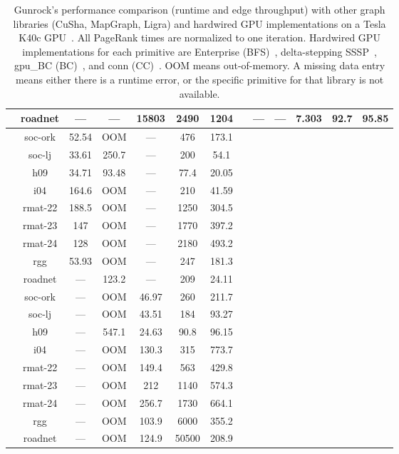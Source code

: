 \documentclass[format=acmsmall,review=false,screen=true]{acmart}
\begin{document}
\begin{table}[t]
{\begin{tabular}{*{13}{c}}
           & roadnet & ---   & ---      & 15803     & 2490  & 1204    && ---   & ---      & 7.303     & 92.7  & 95.85   \\
      \midrule\parbox[t]{2mm}{}
           & soc-ork & 52.54 & OOM      & ---       & 476   & 173.1   \\
           & soc-lj  & 33.61 & 250.7    & ---       & 200   & 54.1    \\
           & h09     & 34.71 & 93.48    & ---       & 77.4  & 20.05   \\
           & i04     & 164.6 & OOM      & ---       & 210   & 41.59   \\
           & rmat-22 & 188.5 & OOM      & ---       & 1250  & 304.5   \\
           & rmat-23 & 147   & OOM      & ---       & 1770  & 397.2   \\
           & rmat-24 & 128   & OOM      & ---       & 2180  & 493.2   \\
           & rgg     & 53.93 & OOM      & ---       & 247   & 181.3   \\
           & roadnet & --- & 123.2    & ---       & 209   & 24.11   \\
      \midrule\parbox[t]{2mm}{}
           & soc-ork & ---   & OOM      & 46.97     & 260   & 211.7   \\
           & soc-lj  & ---   & OOM      & 43.51     & 184   & 93.27   \\
           & h09     & ---   & 547.1    & 24.63     & 90.8  & 96.15   \\
           & i04     & ---   & OOM      & 130.3     & 315   & 773.7   \\
           & rmat-22 & ---   & OOM      & 149.4     & 563   & 429.8   \\
           & rmat-23 & ---   & OOM      & 212       & 1140  & 574.3   \\
           & rmat-24 & ---   & OOM      & 256.7     & 1730  & 664.1   \\
           & rgg     & ---   & OOM      & 103.9     & 6000  & 355.2   \\
           & roadnet & ---   & OOM      & 124.9     & 50500 & 208.9   \\
      \bottomrule
    \end{tabular}}
  \caption[Gunrock's performance comparison with other graph libraries.]
  {Gunrock's performance comparison (runtime and edge throughput) with other
  graph libraries (CuSha, MapGraph, Ligra) and hardwired GPU implementations on
  a Tesla K40c GPU~\@.
  All PageRank times are normalized to one iteration. Hardwired GPU
  implementations for each primitive are Enterprise (BFS)~\protect\cite{Liu:2015:EBG},
  delta-stepping SSSP~\protect\cite{Davidson:2014:WPG},
  gpu\_BC (BC)~\protect\cite{Sariyuce:2013:BCO}, and conn
  (CC)~\protect\cite{Soman:2010:AFG}. OOM means out-of-memory.
  A missing data entry means either there is a runtime error, or the specific
  primitive for that library is not available.
  \label{tab:exp_largetable}}
\end{table}
\end{document}
